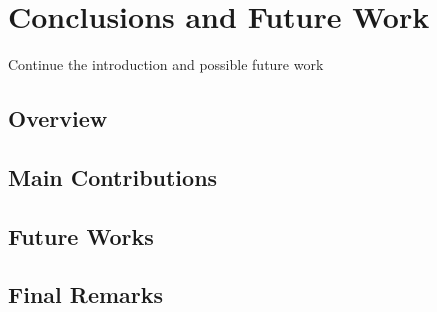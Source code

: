 \chapter{Conclusions and Future Work}\label{ch:conclusion}
Continue the introduction and possible future work
\section{Overview}
\section{Main Contributions}
\section{Future Works}
\section{Final Remarks}